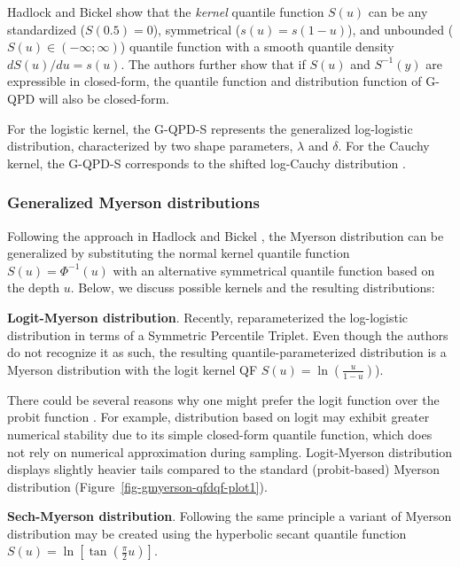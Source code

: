 \documentclass[
  fleqn,
  deca,
  blindrev
]{informs4}
\begin{document}
Hadlock and Bickel
\citep{hadlock2019GeneralizedJohnsonQuantileParameterized} show that the
\emph{kernel} quantile function \(S(u)\) can be any standardized
(\(S(0.5)=0\)), symmetrical (\(s(u)=s(1-u)\)), and unbounded
(\(S(u)\in(-\infty;\infty)\)) quantile function with a smooth quantile
density \(dS(u)/du=s(u)\). The authors further show that if \(S(u)\) and
\(S^{-1}(y)\) are expressible in closed-form, the quantile function and
distribution function of G-QPD will also be closed-form.

For the logistic kernel, the G-QPD-S represents the generalized
log-logistic distribution, characterized by two shape parameters,
\(\lambda\) and \(\delta\). For the Cauchy kernel, the G-QPD-S
corresponds to the shifted log-Cauchy distribution
\citep{hadlock2019GeneralizedJohnsonQuantileParameterized}.

\subsubsection{Generalized Myerson distributions}\label{sec-genmyerson}

Following the approach in Hadlock and Bickel
\citep{hadlock2019GeneralizedJohnsonQuantileParameterized}, the Myerson
distribution can be generalized by substituting the normal kernel
quantile function \(S(u)=\Phi^{-1}(u)\) with an alternative symmetrical
quantile function based on the depth \(u\). Below, we discuss possible
kernels and the resulting distributions:

\textbf{Logit-Myerson distribution}. Recently,
\citet{wilson2023ReconciliationExpertPriors} reparameterized the
log-logistic distribution in terms of a Symmetric Percentile Triplet.
Even though the authors do not recognize it as such, the resulting
quantile-parameterized distribution is a Myerson distribution with the
logit kernel QF \(S(u)=\ln\left(\frac{u}{1-u}\right)\)).

There could be several reasons why one might prefer the logit function
over the probit function \citep{berkson1951WhyPreferLogits}. For
example, distribution based on logit may exhibit greater numerical
stability due to its simple closed-form quantile function, which does
not rely on numerical approximation during sampling. Logit-Myerson
distribution displays slightly heavier tails compared to the standard
(probit-based) Myerson distribution
(Figure~\ref{fig-gmyerson-qfdqf-plot1}).

\textbf{Sech-Myerson distribution}. Following the same principle a
variant of Myerson distribution may be created using the hyperbolic
secant quantile function
\(S(u)=\ln\left[\tan\left(\frac{\pi}{2}u\right)\right]\).
\end{document}
